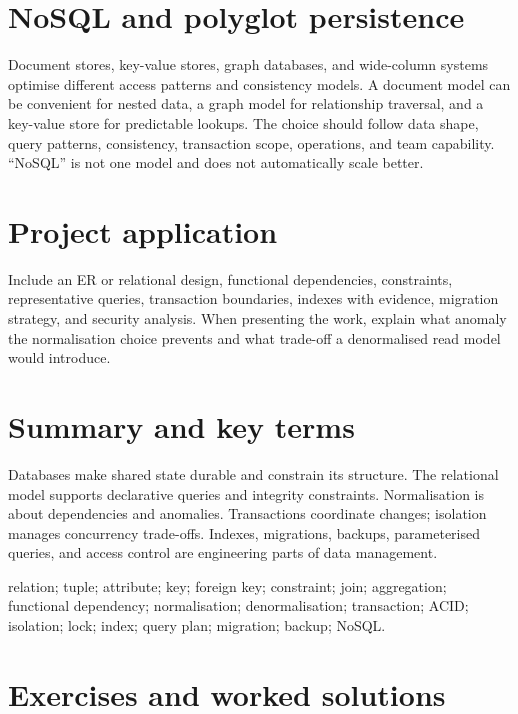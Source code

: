 \section{NoSQL and polyglot persistence}
Document stores, key-value stores, graph databases, and wide-column systems optimise different access patterns and consistency models. A document model can be convenient for nested data, a graph model for relationship traversal, and a key-value store for predictable lookups. The choice should follow data shape, query patterns, consistency, transaction scope, operations, and team capability. \enquote{NoSQL} is not one model and does not automatically scale better.

\section{Project application}
Include an ER or relational design, functional dependencies, constraints, representative queries, transaction boundaries, indexes with evidence, migration strategy, and security analysis. When presenting the work, explain what anomaly the normalisation choice prevents and what trade-off a denormalised read model would introduce.

\section{Summary and key terms}
Databases make shared state durable and constrain its structure. The relational model supports declarative queries and integrity constraints. Normalisation is about dependencies and anomalies. Transactions coordinate changes; isolation manages concurrency trade-offs. Indexes, migrations, backups, parameterised queries, and access control are engineering parts of data management.

\begin{keyterms}relation; tuple; attribute; key; foreign key; constraint; join; aggregation; functional dependency; normalisation; denormalisation; transaction; ACID; isolation; lock; index; query plan; migration; backup; NoSQL.\end{keyterms}

\section{Exercises and worked solutions}

